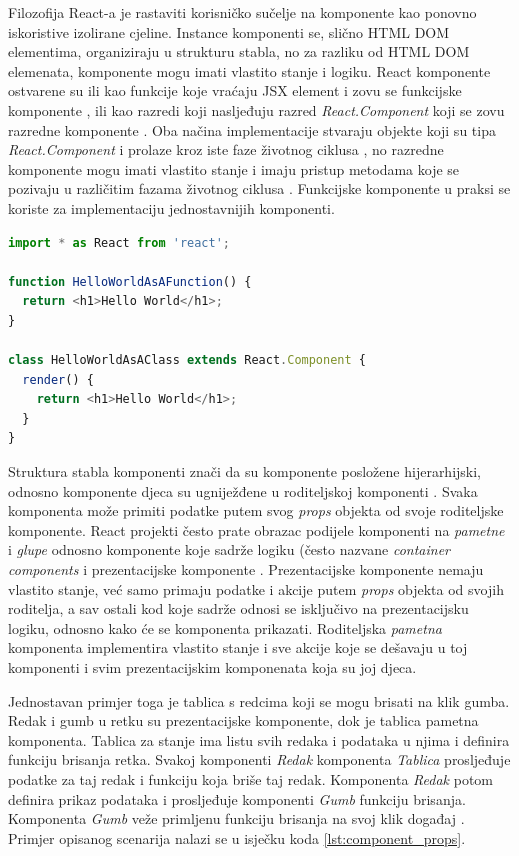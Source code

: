 \documentclass[times, utf8, diplomski, numeric]{fer}
\newcommand{\razmakp}{\vspace{18pt}}
\newcommand{\razmaks}{\vspace{10pt}}
\begin{document}
Filozofija React-a je rastaviti korisničko sučelje na komponente kao ponovno iskoristive izolirane cjeline.
Instance komponenti se, slično HTML DOM elementima, organiziraju u strukturu stabla, no za razliku od HTML DOM elemenata, komponente mogu imati vlastito stanje i logiku. React komponente ostvarene su ili kao funkcije koje vraćaju JSX element i zovu se funkcijske komponente , ili kao razredi koji nasljeđuju razred \emph{React.Component} koji se zovu razredne komponente .
Oba načina implementacije stvaraju objekte koji su tipa \emph{React.Component} i prolaze kroz iste faze životnog ciklusa , no razredne komponente mogu imati vlastito stanje i imaju pristup metodama koje se pozivaju u različitim fazama životnog ciklusa \citep{react_docs}.
Funkcijske komponente u praksi se koriste za implementaciju jednostavnijih komponenti.

\razmakp %
\begin{lstlisting}[language=JavaScript, caption={Primjer funkcijske i razredne komponente}, label={lst:component}]
import * as React from 'react';

function HelloWorldAsAFunction() {
  return <h1>Hello World</h1>;
}

class HelloWorldAsAClass extends React.Component {
  render() {
    return <h1>Hello World</h1>;
  }
}
\end{lstlisting}
\razmaks

Struktura stabla komponenti znači da su komponente posložene hijerarhijski, odnosno komponente djeca  su ugniježđene u roditeljskoj komponenti .
Svaka komponenta može primiti podatke putem svog \emph{props} objekta od svoje roditeljske komponente\citep{react_docs}.
React projekti često prate obrazac podijele komponenti na \emph{pametne} i \emph{glupe} odnosno komponente koje sadrže logiku (često nazvane \emph{container components} i prezentacijske komponente .
Prezentacijske komponente nemaju vlastito stanje, već samo primaju podatke i akcije putem \emph{props} objekta od svojih roditelja, a sav ostali kod koje sadrže odnosi se isključivo na prezentacijsku logiku, odnosno kako će se komponenta prikazati. Roditeljska \emph{pametna} komponenta implementira vlastito stanje i sve akcije koje se dešavaju u toj komponenti i svim prezentacijskim komponenata koja su joj djeca\citep{med_comp}.

Jednostavan primjer toga je tablica s redcima koji se mogu brisati na klik gumba.
Redak i gumb u retku su prezentacijske komponente, dok je tablica pametna komponenta.
Tablica za stanje ima listu svih redaka i podataka u njima i definira funkciju brisanja retka.
Svakoj komponenti \emph{Redak} komponenta \emph{Tablica} prosljeđuje podatke za taj redak i funkciju koja briše taj redak.
Komponenta \emph{Redak} potom definira prikaz podataka i prosljeđuje komponenti \emph{Gumb} funkciju brisanja.
Komponenta \emph{Gumb} veže primljenu funkciju brisanja na svoj klik događaj .
Primjer opisanog scenarija nalazi se u isječku koda \ref{lst:component_props}.
\end{document}
